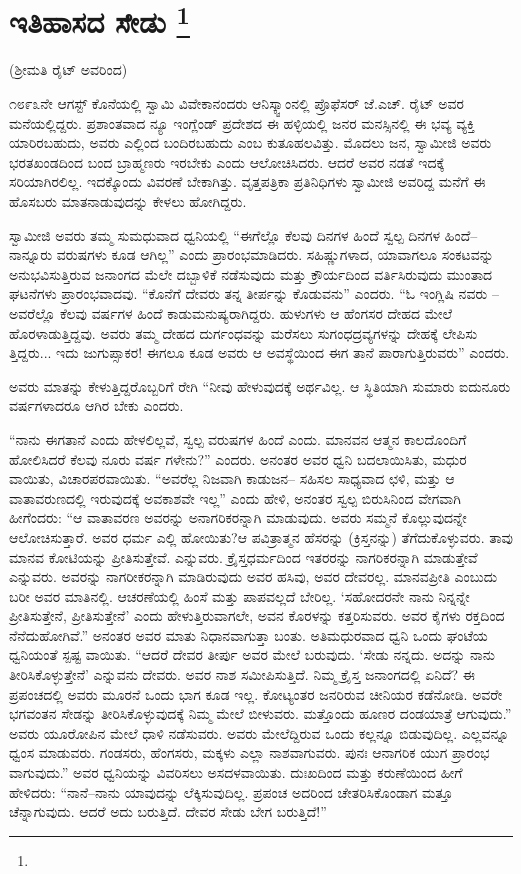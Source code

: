 
\chapter[ಇತಿಹಾಸದ ಸೇಡು ]{ಇತಿಹಾಸದ ಸೇಡು \protect\footnote{}}

\centerline{(ಶ‍್ರೀಮತಿ ರೈಟ್​ ಅವರಿಂದ)}

೧೮೯೩ನೇ ಆಗಸ್ಟ್​ ಕೊನೆಯಲ್ಲಿ ಸ್ವಾಮಿ ವಿವೇಕಾನಂದರು ಆನಿಸ್ಕ್ವಾಂನಲ್ಲಿ ಪ್ರೊಫೆಸರ್​ ಜೆ.ಎಚ್​. ರೈಟ್​ ಅವರ ಮನೆಯಲ್ಲಿದ್ದರು. ಪ್ರಶಾಂತವಾದ ನ್ಯೂ ಇಂಗ್ಲೆಂಡ್​ ಪ್ರದೇಶದ ಈ ಹಳ್ಳಿಯಲ್ಲಿ ಜನರ ಮನಸ್ಸಿನಲ್ಲಿ ಈ ಭವ್ಯ ವ್ಯಕ್ತಿ ಯಾರಿರಬಹುದು, ಅವರು ಎಲ್ಲಿಂದ ಬಂದಿರಬಹುದು ಎಂಬ ಕುತೂಹಲವಿತ್ತು. ಮೊದಲು ಜನ, ಸ್ವಾಮೀಜಿ ಅವರು ಭರತಖಂಡದಿಂದ ಬಂದ ಬ್ರಾಹ್ಮಣರು ಇರಬೇಕು ಎಂದು ಆಲೋಚಿಸಿದರು. ಆದರೆ ಅವರ ನಡತೆ ಇದಕ್ಕೆ ಸರಿಯಾಗಿರಲಿಲ್ಲ. ಇದಕ್ಕೊಂದು ವಿವರಣೆ ಬೇಕಾಗಿತ್ತು. ವೃತ್ತಪತ್ರಿಕಾ ಪ್ರತಿನಿಧಿಗಳು ಸ್ವಾಮೀಜಿ ಅವರಿದ್ದ ಮನೆಗೆ ಈ ಹೊಸಬರು ಮಾತನಾಡುವುದನ್ನು ಕೇಳಲು ಹೋಗಿದ್ದರು.

ಸ್ವಾಮೀಜಿ ಅವರು ತಮ್ಮ ಸುಮಧುವಾದ ಧ್ವನಿಯಲ್ಲಿ “ಈಗೆಲ್ಲೊ ಕೆಲವು ದಿನಗಳ ಹಿಂದೆ ಸ್ವಲ್ಪ ದಿನಗಳ ಹಿಂದೆ–ನಾನ್ನೂರು ವರುಷಗಳು ಕೂಡ ಆಗಿಲ್ಲ” ಎಂದು ಪ್ರಾರಂಭಮಾಡಿದರು. ಸಹಿಷ್ಣುಗಳಾದ, ಯಾವಾಗಲೂ ಸಂಕಟವನ್ನು ಅನುಭವಿಸುತ್ತಿರುವ ಜನಾಂಗದ ಮೆಲೇ ದಬ್ಬಾಳಿಕೆ ನಡೆಸುವುದು ಮತ್ತು ಕ್ರೌರ್ಯದಿಂದ ವರ್ತಿಸಿರುವುದು ಮುಂತಾದ ಘಟನೆಗಳು ಪ್ರಾರಂಭವಾದವು. “ಕೊನೆಗೆ ದೇವರು ತನ್ನ ತೀರ್ಪನ್ನು ಕೊಡುವನು” ಎಂದರು. “ಓ ಇಂಗ್ಲಿಷಿ ನವರು – ಅವರೆಲ್ಲೊ ಕೆಲವು ವರ್ಷಗಳ ಹಿಂದೆ ಕಾಡುಮನುಷ್ಯರಾಗಿದ್ದರು. ಹುಳುಗಳು ಆ ಹೆಂಗಸರ ದೇಹದ ಮೇಲೆ ಹೊರಳಾಡುತ್ತಿದ್ದವು. ಅವರು ತಮ್ಮ ದೇಹದ ದುರ್ಗಂಧವನ್ನು ಮರೆಸಲು ಸುಗಂಧದ್ರವ್ಯಗಳನ್ನು ದೇಹಕ್ಕೆ ಲೇಪಿಸು ತ್ತಿದ್ದರು... ಇದು ಜುಗುಪ್ಸಾಕರ! ಈಗಲೂ ಕೂಡ ಅವರು ಆ ಅವಸ್ಥೆಯಿಂದ ಈಗ ತಾನೆ ಪಾರಾಗುತ್ತಿರುವರು” ಎಂದರು.

ಅವರು ಮಾತನ್ನು ಕೇಳುತ್ತಿದ್ದರೊಬ್ಬರಿಗೆ ರೇಗಿ “ನೀವು ಹೇಳುವುದಕ್ಕೆ ಅರ್ಥವಿಲ್ಲ. ಆ ಸ್ಥಿತಿಯಾಗಿ ಸುಮಾರು ಐದುನೂರು ವರ್ಷಗಳಾದರೂ ಆಗಿರ ಬೇಕು ಎಂದರು.

“ನಾನು ಈಗತಾನೆ ಎಂದು ಹೇಳಲಿಲ್ಲವೆ, ಸ್ವಲ್ಪ ವರುಷಗಳ ಹಿಂದೆ ಎಂದು. ಮಾನವನ ಆತ್ಮನ ಕಾಲದೊಂದಿಗೆ ಹೋಲಿಸಿದರೆ ಕೆಲವು ನೂರು ವರ್ಷ ಗಳೇನು?” ಎಂದರು. ಅನಂತರ ಅವರ ಧ್ವನಿ ಬದಲಾಯಿಸಿತು, ಮಧುರ ವಾಯಿತು, ವಿಚಾರಪರವಾಯಿತು. “ಅವರೆಲ್ಲ ನಿಜವಾಗಿ ಕಾಡುಜನ– ಸಹಿಸಲ ಸಾಧ್ಯವಾದ ಛಳಿ, ಮತ್ತು ಆ ವಾತಾವರುಣದಲ್ಲಿ ಇರುವುದಕ್ಕೆ ಅವಕಾಶವೇ ಇಲ್ಲ” ಎಂದು ಹೇಳಿ, ಅನಂತರ ಸ್ವಲ್ಪ ಬಿರುಸಿನಿಂದ ವೇಗವಾಗಿ ಹೀಗೆಂದರು: “ಆ ವಾತಾವರಣ ಅವರನ್ನು ಅನಾಗರಿಕರನ್ನಾಗಿ ಮಾಡುವುದು. ಅವರು ಸಮ್ಮನೆ ಕೊಲ್ಲುವುದನ್ನೇ ಆಲೋಚಿಸುತ್ತಾರೆ. ಅವರ ಧರ್ಮ ಎಲ್ಲಿ ಹೋಯಿತು?ಆ ಪವಿತ್ರಾತ್ಮನ ಹೆಸರನ್ನು (ಕ್ರಿಸ್ತನನ್ನು) ತೆಗೆದುಕೊಳ್ಳುವರು. ತಾವು ಮಾನವ ಕೋಟಿಯನ್ನು ಪ್ರೀತಿಸುತ್ತೇವೆ. ಎನ್ನುವರು. ಕ್ರೈಸ್ತಧರ್ಮದಿಂದ ಇತರರನ್ನು ನಾಗರಿಕರನ್ನಾಗಿ ಮಾಡುತ್ತೇವೆ ಎನ್ನುವರು. ಅವರನ್ನು ನಾಗರೀಕರನ್ನಾಗಿ ಮಾಡಿರುವುದು ಅವರ ಹಸಿವು, ಅವರ ದೇವರಲ್ಲ. ಮಾನವಪ್ರೀತಿ ಎಂಬುದು ಬರೀ ಅವರ ಮಾತಿನಲ್ಲಿ. ಆಚರಣೆಯಲ್ಲಿ ಹಿಂಸೆ ಮತ್ತು ಪಾಪವಲ್ಲದೆ ಬೇರಿಲ್ಲ. ‘ಸಹೋದರನೇ ನಾನು ನಿನ್ನನ್ನೇ ಪ್ರೀತಿಸುತ್ತೇನೆ, ಪ್ರೀತಿಸುತ್ತೇನೆ’ ಎಂದು ಹೇಳುತ್ತಿರುವಾಗಲೇ, ಅವನ ಕೊರಳನ್ನು ಕತ್ತರಿಸುವರು. ಅವರ ಕೈಗಳು ರಕ್ತದಿಂದ ನೆನೆದುಹೋಗಿವೆ.” ಅನಂತರ ಅವರ ಮಾತು ನಿಧಾನವಾಗುತ್ತಾ ಬಂತು. ಅತಿಮಧುರವಾದ ಧ್ವನಿ ಒಂದು ಘಂಟೆಯ ಧ್ವನಿಯಂತೆ ಸ್ಪಷ್ಟ ವಾಯಿತು. “ಆದರೆ ದೇವರ ತೀರ್ಪು ಅವರ ಮೇಲೆ ಬರುವುದು. ‘ಸೇಡು ನನ್ನದು. ಅದನ್ನು ನಾನು ತೀರಿಸಿಕೊಳ್ಳುತ್ತೇನೆ’ ಎನ್ನುವನು ದೇವರು. ಅವರ ನಾಶ ಸಮೀಪಿಸುತ್ತಿದೆ. ನಿಮ್ಮ ಕ್ರೈಸ್ತ ಜನಾಂಗದಲ್ಲಿ ಏನಿದೆ? ಈ ಪ್ರಪಂಚದಲ್ಲಿ ಅವರು ಮೂರನೆ ಒಂದು ಭಾಗ ಕೂಡ ಇಲ್ಲ. ಕೋಟ್ಯಂತರ ಜನರಿರುವ ಚೀನಿಯರ ಕಡೆನೋಡಿ. ಅವರೇ ಭಗವಂತನ ಸೇಡನ್ನು ತೀರಿಸಿಕೊಳ್ಳುವುದಕ್ಕೆ ನಿಮ್ಮ ಮೇಲೆ ಬೀಳುವರು. ಮತ್ತೊಂದು ಹೂಣರ ದಂಡಯಾತ್ರೆ ಆಗುವುದು.” ಅವರು ಯೂರೋಪಿನ ಮೇಲೆ ಧಾಳಿ ನಡೆಸುವರು. ಅವರು ಮೇಲೆದ್ದಿರುವ ಒಂದು ಕಲ್ಲನ್ನೂ ಬಿಡುವುದಿಲ್ಲ. ಎಲ್ಲವನ್ನೂ ಧ್ವಂಸ ಮಾಡುವರು. ಗಂಡಸರು, ಹೆಂಗಸರು, ಮಕ್ಕಳು ಎಲ್ಲಾ ನಾಶವಾಗುವರು. ಪುನಃ ಆನಾಗರಿಕ ಯುಗ ಪ್ರಾರಂಭ ವಾಗುವುದು.” ಅವರ ಧ್ವನಿಯನ್ನು ವಿವರಿಸಲು ಅಸದಳವಾಯಿತು. ದುಃಖದಿಂದ ಮತ್ತು ಕರುಣೆಯಿಂದ ಹೀಗೆ ಹೇಳಿದರು: “ನಾನೆ–ನಾನು ಯಾವುದನ್ನು ಲೆಕ್ಕಿಸುವುದಿಲ್ಲ. ಪ್ರಪಂಚ ಅದರಿಂದ ಚೇತರಿಸಿಕೊಂಡಾಗ ಮತ್ತೂ ಚೆನ್ನಾಗುವುದು. ಆದರೆ ಅದು ಬರುತ್ತಿದೆ. ದೇವರ ಸೇಡು ಬೇಗ ಬರುತ್ತಿದೆ!”

